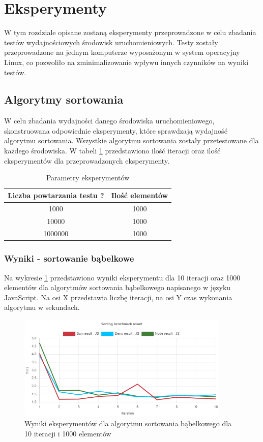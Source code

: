\section{Eksperymenty}
W tym rozdziale opisane zostaną eksperymenty przeprowadzone w celu zbadania testów wydajnościowych środowisk uruchomieniowych. Testy zostały przeprowadzone na jednym komputerze wyposażonym w system operacyjny Linux, co pozwoliło na zminimalizowanie wpływu innych czynników na wyniki testów. 

\subsection{Algorytmy sortowania}
W celu zbadania wydajności danego środowiska uruchomieniowego, skonstruowana odpowiednie eksperymenty, które sprawdzają wydajność algorytmu sortowania. Wszystkie algorytmu sortowania zostały przetestowane dla każdego środowiska. W tabeli \ref{tab:sorting_experiments} przedstawiono ilość iteracji oraz ilość eksperymentów dla przeprowadzonych eksperymenty.

\begin{table}[H]
  \centering
  \begin{tabular}{|c|c|}
    \hline
    \textbf{Liczba powtarzania testu ?} & \textbf{Ilość elementów} \\ \hline
    1000 & 1000 \\ \hline
    10000 & 1000 \\ \hline
    1000000 & 1000 \\ \hline
  \end{tabular}
  \caption{Parametry eksperymentów}
  \label{tab:sorting_experiments}
\end{table}

\subsubsection{Wyniki - sortowanie bąbelkowe}
Na wykresie \ref{fig:bubble_sorting_e1} przedstawiono wyniki eksperymentu dla 10 iteracji oraz 1000 elementów dla algorytmów sortowania bąbelkowego napisanego w języku JavaScript. Na osi X przedstawia liczbę iteracji, na osi Y czas wykonania algorytmu w sekundach. 

\begin{figure}[H]
  \centering
  \includegraphics[width=0.9\textwidth]{Figures/sorting/bubble/e1_js.png}
  \caption{Wyniki eksperymentów dla algorytmu sortowania bąbelkowego dla 10 iteracji i 1000 elementów}
  \label{fig:bubble_sorting_e1}
\end{figure}

